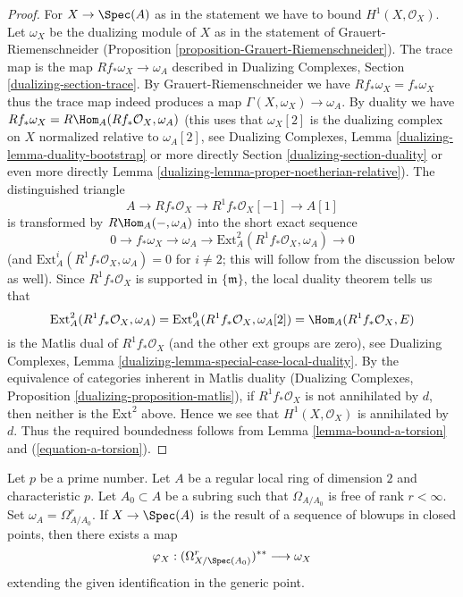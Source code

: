 \begin{proof}
For $X \to \Spec(A)$ as in the statement we have to bound
$H^1(X, \mathcal{O}_X)$. Let $\omega_X$ be the dualizing module
of $X$ as in the statement of Grauert-Riemenschneider
(Proposition \ref{proposition-Grauert-Riemenschneider}).
The trace map is the map $Rf_*\omega_X \to \omega_A$ described
in Dualizing Complexes, Section \ref{dualizing-section-trace}.
By Grauert-Riemenschneider we have $Rf_*\omega_X = f_*\omega_X$
thus the trace map indeed produces a map $\Gamma(X, \omega_X) \to \omega_A$.
By duality we have $Rf_*\omega_X = R\Hom_A(Rf_*\mathcal{O}_X, \omega_A)$
(this uses that $\omega_X[2]$ is the dualizing complex on $X$
normalized relative to $\omega_A[2]$,
see Dualizing Complexes, Lemma \ref{dualizing-lemma-duality-bootstrap}
or more directly Section \ref{dualizing-section-duality} or even more directly
Lemma \ref{dualizing-lemma-proper-noetherian-relative}).
The distinguished triangle
$$
A \to Rf_*\mathcal{O}_X \to R^1f_*\mathcal{O}_X[-1] \to A[1]
$$
is transformed by $R\Hom_A(-, \omega_A)$ into the short exact sequence
$$
0 \to f_*\omega_X \to \omega_A \to
\text{Ext}_A^2(R^1f_*\mathcal{O}_X, \omega_A) \to 0
$$
(and $\text{Ext}_A^i(R^1f_*\mathcal{O}_X, \omega_A) = 0$ for $i \not = 2$;
this will follow from the discussion below as well).
Since $R^1f_*\mathcal{O}_X$ is supported in $\{\mathfrak m\}$, the
local duality theorem tells us that
$$
\text{Ext}_A^2(R^1f_*\mathcal{O}_X, \omega_A) =
\text{Ext}_A^0(R^1f_*\mathcal{O}_X, \omega_A[2]) =
\Hom_A(R^1f_*\mathcal{O}_X, E)
$$
is the Matlis dual of $R^1f_*\mathcal{O}_X$ (and the other
ext groups are zero), see
Dualizing Complexes, Lemma \ref{dualizing-lemma-special-case-local-duality}.
By the equivalence of categories inherent in Matlis duality
(Dualizing Complexes, Proposition \ref{dualizing-proposition-matlis}),
if $R^1f_*\mathcal{O}_X$ is not annihilated by $d$,
then neither is the $\text{Ext}^2$ above. Hence we see that
$H^1(X, \mathcal{O}_X)$ is annihilated by $d$. Thus the required
boundedness follows from Lemma \ref{lemma-bound-a-torsion} and
(\ref{equation-a-torsion}).
\end{proof}

\begin{lemma}
\label{lemma-compare-differentials-dualizing}
Let $p$ be a prime number.
Let $A$ be a regular local ring of dimension $2$ and characteristic $p$.
Let $A_0 \subset A$ be a subring such that $\Omega_{A/A_0}$ is free
of rank $r < \infty$. Set $\omega_A = \Omega^r_{A/A_0}$. If $X \to \Spec(A)$
is the result of a sequence of blowups in closed points, then
there exists a map
$$
\varphi_X : (\Omega^r_{X/\Spec(A_0)})^{**} \longrightarrow \omega_X
$$
extending the given identification in the generic point.
\end{lemma}


